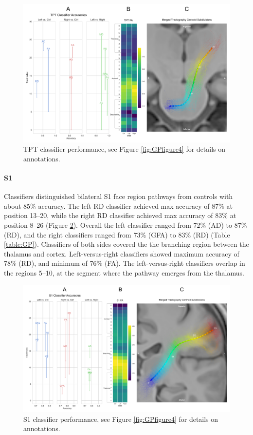 \begin{figure}[ht]
\centering
\includegraphics[width=\linewidth]{figure-GP-TPT.pdf}
\caption{TPT classifier performance, see Figure \ref{fig:GPfigure4} for details on annotations.}
\label{fig:GPfigureTPT}
\end{figure}

\paragraph{S1}
Classifiers distinguished bilateral S1 face region pathways from controls with about 85\% accuracy. The left RD classifier achieved max accuracy of 87\% at position 13--20, while the right RD classifier achieved max accuracy of 83\% at position 8--26 (Figure \ref{fig:GPfigure5}). Overall the left classifier ranged from 72\% (AD) to 87\% (RD), and the right classifiers ranged from 73\% (GFA) to 83\% (RD) (Table \ref{table:GP}). Classifiers of both sides covered the the branching region between the thalamus and cortex. Left-versus-right classifiers showed maximum accuracy of 78\% (RD), and minimum of 76\% (FA). The left-versus-right classifiers overlap in the regions 5--10, at the segment where the pathway emerges from the thalamus.

\begin{figure}[ht]
\centering
\includegraphics[width=\linewidth]{figure-GP-S1.pdf}
\caption{S1 classifier performance, see Figure \ref{fig:GPfigure4} for details on annotations.}
\label{fig:GPfigure5}
\end{figure}

